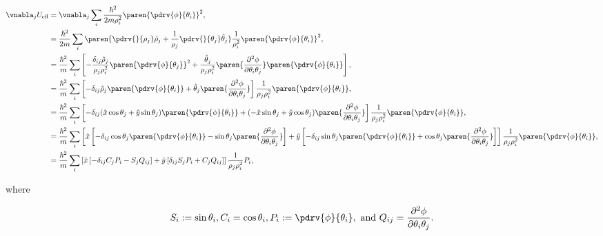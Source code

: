 \documentclass[onecolumn,amsmath,amssymb,nofootinbib,floatfix]{revtex4}
\begin{document}
$$
\begin{aligned}
\vnabla_j U_{\text{eff}}
&= \vnabla_j \sum_i \frac{\hbar^2}{2m\rho_i^2}\paren{\pdrv{\phi}{\theta_i}}^2, \\
&= \frac{\hbar^2}{2m} \sum_i \paren{\pdrv{}{\rho_j}\hat\rho_j + \frac{1}{\rho_j}\pdrv{}{\theta_j}\hat\theta_j} \frac{1}{\rho_i^2} \paren{\pdrv{\phi}{\theta_i}}^2, \\
&= \frac{\hbar^2}{m} \sum_i \left[-\frac{\delta_{ij} \hat\rho_j}{\rho_j\rho_i^2} \paren{\pdrv{\phi}{\theta_j}}^2 + \frac{\hat\theta_j}{\rho_j\rho_i^2} \paren{\frac{\partial^2\phi}{\partial \theta_i \theta_j}}\paren{\pdrv{\phi}{\theta_i}}\right], \\
&= \frac{\hbar^2}{m} \sum_i \left[-\delta_{ij}\hat\rho_j \paren{\pdrv{\phi}{\theta_i}} + \hat\theta_j \paren{\frac{\partial^2\phi}{\partial \theta_i \theta_j}}\right]\frac{1}{\rho_j\rho_i^2}\paren{\pdrv{\phi}{\theta_i}}, \\
&= \frac{\hbar^2}{m} \sum_i \left[-\delta_{ij}(\hat x\cos\theta_j + \hat y\sin\theta_j)\paren{\pdrv{\phi}{\theta_i}} + (-\hat x\sin\theta_j + \hat y\cos\theta_j) \paren{\frac{\partial^2\phi}{\partial \theta_i \theta_j}}\right]\frac{1}{\rho_j\rho_i^2}\paren{\pdrv{\phi}{\theta_i}}, \\
&= \frac{\hbar^2}{m} \sum_i \left[
\hat x \left[-\delta_{ij}\cos\theta_j\paren{\pdrv{\phi}{\theta_i}} - \sin\theta_j\paren{\frac{\partial^2\phi}{\partial \theta_i \theta_j}}\right] +
\hat y \left[-\delta_{ij}\sin\theta_j\paren{\pdrv{\phi}{\theta_i}} + \cos\theta_j\paren{\frac{\partial^2\phi}{\partial \theta_i \theta_j}}\right]
 \right]\frac{1}{\rho_j\rho_i^2}\paren{\pdrv{\phi}{\theta_i}}, \\
&= \frac{\hbar^2}{m} \sum_i \left[
\hat x \left[-\delta_{ij} C_j P_i - S_j Q_{ij}\right] +
\hat y \left[ \delta_{ij} S_j P_i + C_j Q_{ij}\right]
 \right]\frac{1}{\rho_j\rho_i^2} P_i, \\
\end{aligned}
$$

where

$$S_i := \sin\theta_i, C_i = \cos\theta_i, P_i := \pdrv{\phi}{\theta_i},\,\,\text{and}\,\,Q_{ij} = \frac{\partial^2\phi}{\partial \theta_i \theta_j}.$$
\end{document}
